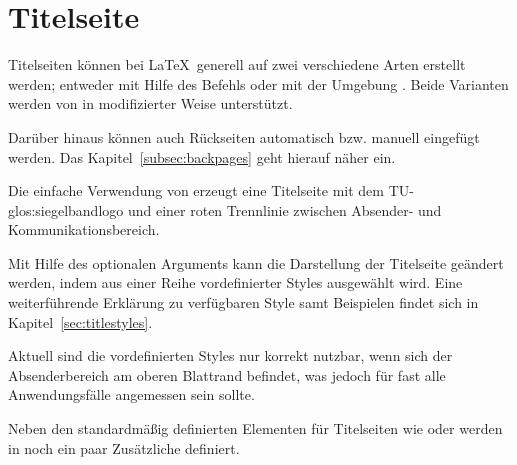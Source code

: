 \section{Titelseite}\label{sec:titlepage}

Titelseiten können bei \LaTeX\ generell auf zwei verschiedene Arten erstellt
werden; entweder mit Hilfe des Befehls  oder mit
der Umgebung . Beide Varianten werden von \tubslatex
in modifizierter Weise unterstützt.

Darüber hinaus können auch Rückseiten automatisch bzw. manuell eingefügt
werden. Das Kapitel~\ref{subsec:backpages} geht hierauf näher ein.

\begin{Declaration}
\end{Declaration}

Die einfache Verwendung von  erzeugt eine Titelseite
mit dem TU-\gls{glos:siegelbandlogo} und einer roten Trennlinie zwischen Absender- und
Kommunikationsbereich.

Mit Hilfe des optionalen Arguments  kann die Darstellung
der Titelseite geändert werden, indem aus einer Reihe vordefinierter Styles
ausgewählt wird. Eine weiterführende Erklärung zu verfügbaren Style samt
Beispielen findet sich in Kapitel~\ref{sec:titlestyles}.\bigskip

\begin{hint}
  Aktuell sind die vordefinierten Styles nur korrekt nutzbar, wenn sich der
  Absenderbereich am oberen Blattrand befindet, was jedoch für fast alle
  Anwendungsfälle angemessen sein sollte.
\end{hint}


Neben den standardmäßig definierten Elementen für Titelseiten wie 
oder  werden in \tubslatex noch ein paar Zusätzliche definiert.

\begin{Declaration}
  \\
  \\
\end{Declaration}

